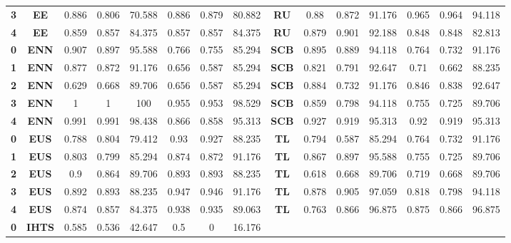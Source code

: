 {{\begin{tabular}{c|c|cccccc|ccccccc}
\textbf{3} & \textbf{EE} & 0.886 & 0.806 & 70.588 & 0.886 & 0.879 & 80.882 & \multicolumn{1}{c|}{\textbf{RU}} & 0.88  & 0.872 & 91.176 & 0.965 & 0.964 & 94.118 \\
\textbf{4} & \textbf{EE} & 0.859 & 0.857 & 84.375 & 0.857 & 0.857 & 84.375 & \multicolumn{1}{c|}{\textbf{RU}} & 0.879 & 0.901 & 92.188 & 0.848 & 0.848 & 82.813 \\
\textbf{0} & \textbf{ENN} & 0.907 & 0.897 & 95.588 & 0.766 & 0.755 & 85.294 & \multicolumn{1}{c|}{\textbf{SCB}} & 0.895 & 0.889 & 94.118 & 0.764 & 0.732 & 91.176 \\
\textbf{1} & \textbf{ENN} & 0.877 & 0.872 & 91.176 & 0.656 & 0.587 & 85.294 & \multicolumn{1}{c|}{\textbf{SCB}} & 0.821 & 0.791 & 92.647 & 0.71  & 0.662 & 88.235 \\
\textbf{2} & \textbf{ENN} & 0.629 & 0.668 & 89.706 & 0.656 & 0.587 & 85.294 & \multicolumn{1}{c|}{\textbf{SCB}} & 0.884 & 0.732 & 91.176 & 0.846 & 0.838 & 92.647 \\
\textbf{3} & \textbf{ENN} & 1     & 1     & 100   & 0.955 & 0.953 & 98.529 & \multicolumn{1}{c|}{\textbf{SCB}} & 0.859 & 0.798 & 94.118 & 0.755 & 0.725 & 89.706 \\
\textbf{4} & \textbf{ENN} & 0.991 & 0.991 & 98.438 & 0.866 & 0.858 & 95.313 & \multicolumn{1}{c|}{\textbf{SCB}} & 0.927 & 0.919 & 95.313 & 0.92  & 0.919 & 95.313 \\
\textbf{0} & \textbf{EUS} & 0.788 & 0.804 & 79.412 & 0.93  & 0.927 & 88.235 & \multicolumn{1}{c|}{\textbf{TL}} & 0.794 & 0.587 & 85.294 & 0.764 & 0.732 & 91.176 \\
\textbf{1} & \textbf{EUS} & 0.803 & 0.799 & 85.294 & 0.874 & 0.872 & 91.176 & \multicolumn{1}{c|}{\textbf{TL}} & 0.867 & 0.897 & 95.588 & 0.755 & 0.725 & 89.706 \\
\textbf{2} & \textbf{EUS} & 0.9   & 0.864 & 89.706 & 0.893 & 0.893 & 88.235 & \multicolumn{1}{c|}{\textbf{TL}} & 0.618 & 0.668 & 89.706 & 0.719 & 0.668 & 89.706 \\
\textbf{3} & \textbf{EUS} & 0.892 & 0.893 & 88.235 & 0.947 & 0.946 & 91.176 & \multicolumn{1}{c|}{\textbf{TL}} & 0.878 & 0.905 & 97.059 & 0.818 & 0.798 & 94.118 \\
\textbf{4} & \textbf{EUS} & 0.874 & 0.857 & 84.375 & 0.938 & 0.935 & 89.063 & \multicolumn{1}{c|}{\textbf{TL}} & 0.763 & 0.866 & 96.875 & 0.875 & 0.866 & 96.875 \\
\textbf{0} & \textbf{IHTS} & 0.585 & 0.536 & 42.647 & 0.5   & 0     & 16.176 &       &       &       &       &       &       &  \\

\end{tabular}}}
